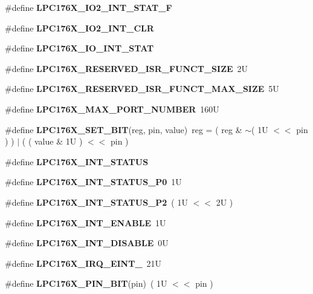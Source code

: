 \begin{DoxyCompactItemize}
\item 
\#define {\bfseries L\+P\+C176\+X\+\_\+\+I\+O2\+\_\+\+I\+N\+T\+\_\+\+S\+T\+A\+T\+\_\+F}
\item 
\#define {\bfseries L\+P\+C176\+X\+\_\+\+I\+O2\+\_\+\+I\+N\+T\+\_\+\+C\+LR}
\item 
\#define {\bfseries L\+P\+C176\+X\+\_\+\+I\+O\+\_\+\+I\+N\+T\+\_\+\+S\+T\+AT}
\item 
\mbox{\label{gpio-defs_8h_a31e5b4210d28c62651f72e79c44e7d72}} 
\#define {\bfseries L\+P\+C176\+X\+\_\+\+R\+E\+S\+E\+R\+V\+E\+D\+\_\+\+I\+S\+R\+\_\+\+F\+U\+N\+C\+T\+\_\+\+S\+I\+ZE}~2U
\item 
\mbox{\label{gpio-defs_8h_ad36f77ccd2bc2bfe23109f8d15767098}} 
\#define {\bfseries L\+P\+C176\+X\+\_\+\+R\+E\+S\+E\+R\+V\+E\+D\+\_\+\+I\+S\+R\+\_\+\+F\+U\+N\+C\+T\+\_\+\+M\+A\+X\+\_\+\+S\+I\+ZE}~5U
\item 
\mbox{\label{gpio-defs_8h_a86f08020a1693aebca00d3c4700f5067}} 
\#define {\bfseries L\+P\+C176\+X\+\_\+\+M\+A\+X\+\_\+\+P\+O\+R\+T\+\_\+\+N\+U\+M\+B\+ER}~160U
\item 
\mbox{\label{gpio-defs_8h_a68b25c8e9967206d760c79d3d6591b9b}} 
\#define {\bfseries L\+P\+C176\+X\+\_\+\+S\+E\+T\+\_\+\+B\+IT}(reg,  pin,  value)~reg = ( reg \& $\sim$( 1\+U $<$$<$ pin ) ) $\vert$ ( ( value \& 1\+U ) $<$$<$ pin )
\item 
\#define {\bfseries L\+P\+C176\+X\+\_\+\+I\+N\+T\+\_\+\+S\+T\+A\+T\+US}
\item 
\mbox{\label{gpio-defs_8h_ab54bdb838b9f79c22a2dd7662b0de07b}} 
\#define {\bfseries L\+P\+C176\+X\+\_\+\+I\+N\+T\+\_\+\+S\+T\+A\+T\+U\+S\+\_\+\+P0}~1U
\item 
\mbox{\label{gpio-defs_8h_a9d818d8cb87bb7c9180e7d64e3417313}} 
\#define {\bfseries L\+P\+C176\+X\+\_\+\+I\+N\+T\+\_\+\+S\+T\+A\+T\+U\+S\+\_\+\+P2}~( 1\+U $<$$<$ 2\+U )
\item 
\mbox{\label{gpio-defs_8h_adf8bbb3a090b86cfb52994a6495be82f}} 
\#define {\bfseries L\+P\+C176\+X\+\_\+\+I\+N\+T\+\_\+\+E\+N\+A\+B\+LE}~1U
\item 
\mbox{\label{gpio-defs_8h_a997e72c95775bd6d10abced0977cc29b}} 
\#define {\bfseries L\+P\+C176\+X\+\_\+\+I\+N\+T\+\_\+\+D\+I\+S\+A\+B\+LE}~0U
\item 
\mbox{\label{gpio-defs_8h_a155667feb5eb33dd33f1883546a39c79}} 
\#define {\bfseries L\+P\+C176\+X\+\_\+\+I\+R\+Q\+\_\+\+E\+I\+N\+T\+\_}~21U
\item 
\mbox{\label{gpio-defs_8h_a0efa9f86195bc2ab2915e6c9595ff511}} 
\#define {\bfseries L\+P\+C176\+X\+\_\+\+P\+I\+N\+\_\+\+B\+IT}(pin)~( 1\+U $<$$<$ pin )
\end{DoxyCompactItemize}
